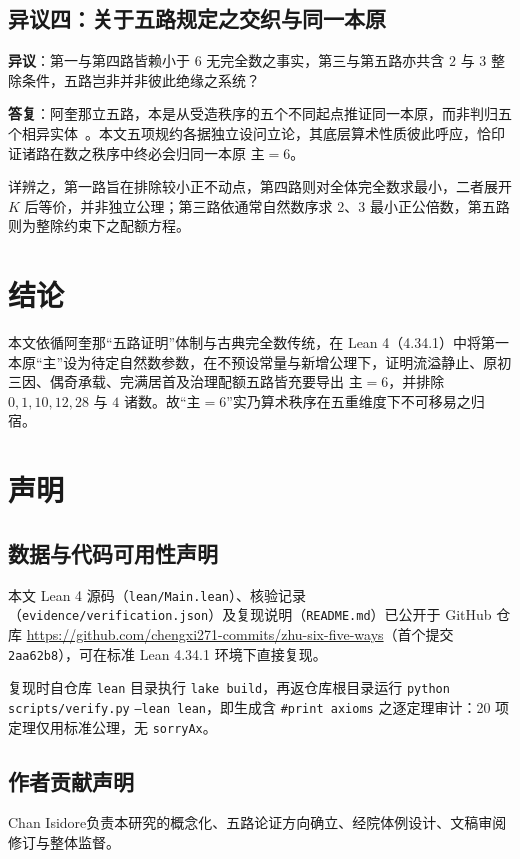 \documentclass[11pt,a4paper]{ctexart}
\begin{document}
\subsection{异议四：关于五路规定之交织与同一本原}

\noindent\textbf{异议}：第一与第四路皆赖小于 $6$ 无完全数之事实，第三与第五路亦共含 $2$ 与 $3$ 整除条件，五路岂非并非彼此绝缘之系统？

\noindent\textbf{答复}：阿奎那立五路，本是从受造秩序的五个不同起点推证同一本原，而非判归五个相异实体~\cite{aquinas}。本文五项规约各据独立设问立论，其底层算术性质彼此呼应，恰印证诸路在数之秩序中终必会归同一本原 $\text{主}=6$。

详辨之，第一路旨在排除较小正不动点，第四路则对全体完全数求最小，二者展开 $K$ 后等价，并非独立公理；第三路依通常自然数序求 2、3 最小正公倍数，第五路则为整除约束下之配额方程。

\section{结论}

本文依循阿奎那``五路证明''体制与古典完全数传统，在 Lean 4（4.34.1）中将第一本原``主''设为待定自然数参数，在不预设常量与新增公理下，证明流溢静止、原初三因、偶奇承载、完满居首及治理配额五路皆充要导出 $\text{主}=6$，并排除 $0, 1, 10, 12, 28$ 与 $4$ 诸数。故``$\text{主}=6$''实乃算术秩序在五重维度下不可移易之归宿。

\section*{声明}

\subsection*{数据与代码可用性声明}
本文 Lean 4 源码（\texttt{lean/Main.lean}）、核验记录（\texttt{evidence/verification.json}）及复现说明（\texttt{README.md}）已公开于 GitHub 仓库 \url{https://github.com/chengxi271-commits/zhu-six-five-ways}（首个提交 \texttt{2aa62b8}），可在标准 Lean 4.34.1 环境下直接复现。

复现时自仓库 \texttt{lean} 目录执行 \texttt{lake build}，再返仓库根目录运行 \texttt{python} \texttt{scripts/verify.py} \texttt{--lean lean}，即生成含 \texttt{\#print axioms} 之逐定理审计：20 项定理仅用标准公理，无 \texttt{sorryAx}。

\subsection*{作者贡献声明}
Chan Isidore负责本研究的概念化、五路论证方向确立、经院体例设计、文稿审阅修订与整体监督。
\end{document}

